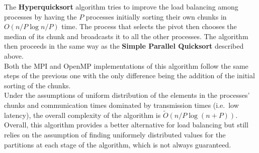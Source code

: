 \documentclass[../main.tex]{subfiles}
\begin{document}
The \textbf{Hyperquicksort} algorithm tries to improve the load balancing among processes by having the $P$ processes initially sorting their own chunks in $O(n/P \log n/P)$ time.
The process that selects the pivot then chooses the median of its chunk and broadcasts it  to all the other processes. The algorithm then proceeds in the same way as the \textbf{Simple Parallel Quicksort} described above.\\
Both the MPI and OpenMP implementations of this algorithm follow the same steps of the previous one with the only difference being the addition of the initial sorting of the chunks.\\
Under the assumptions of uniform distribution of the elements in the processes' chunks and communication times dominated by transmission times (i.e.\ low latency), the overall complexity of the algorithm is $\tilde{O}(n/P \log(n+P))$. Overall, this algorithm provides a better alternative for load balancing but still relies on the assumption of finding uniformely distributed values for the partitions at each stage of the algorithm, which is not always guaranteed.\\
\end{document}

